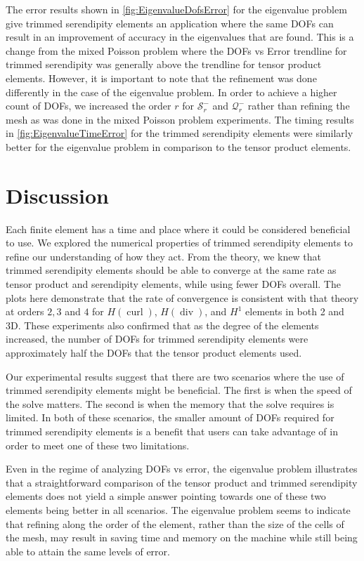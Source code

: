 \documentclass[format=acmsmall,screen,timestamp=false,a4paper]{acmart}
\DeclareMathOperator{\Div}{div}
\DeclareMathOperator{\curl}{curl}
\newcommand{\calQ}{\mathcal{Q}}
\newcommand{\calS}{\mathcal{S}}
\newcommand{\hcurl}{\ensuremath{{H}(\curl)}\xspace}
\newcommand{\hdiv}{\ensuremath{{H}(\Div)}\xspace}
\begin{document}
The error results shown in \cref{fig:EigenvalueDofsError} for the eigenvalue problem give trimmed serendipity elements an application where the same DOFs can result in an improvement of accuracy in the eigenvalues that are found.  This is a change from the mixed Poisson problem where the DOFs vs Error trendline for trimmed serendipity was generally above the trendline for tensor product elements.  However, it is important to note that the refinement was done differently in the case of the eigenvalue problem.  In order to achieve a higher count of DOFs, we increased the order $r$ for $\calS^-_r$ and $\calQ^-_r$ rather than refining the mesh as was done in the mixed Poisson problem experiments.  The timing results in \ref{fig:EigenvalueTimeError} for the trimmed serendipity elements were similarly better for the eigenvalue problem in comparison to the tensor product elements.


\section{Discussion}

Each finite element has a time and place where it could be considered beneficial to use.  We explored the numerical properties of trimmed serendipity elements to refine our understanding of how they act.  From the theory, we knew that trimmed serendipity elements should be able to converge at the same rate as tensor product and serendipity elements, while using fewer DOFs overall.  The plots here demonstrate that the rate of convergence is consistent with that theory at orders $2, 3$ and $4$ for \hcurl, \hdiv, and $H^1$ elements in both 2 and 3D.  These experiments also confirmed that as the degree of the elements increased, the number of DOFs for trimmed serendipity elements were approximately half the DOFs that the tensor product elements used.

Our experimental results suggest that there are two scenarios where the use of trimmed serendipity elements might be beneficial.  The first is when the speed of the solve matters.  The second is when the memory that the solve requires is limited.  In both of these scenarios, the smaller amount of DOFs required for trimmed serendipity elements is a benefit that users can take advantage of in order to meet one of these two limitations.  

Even in the regime of analyzing DOFs vs error, the eigenvalue problem illustrates that a straightforward comparison of the tensor product and trimmed serendipity elements does not yield a simple answer pointing towards one of these two elements being better in all scenarios.  The eigenvalue problem seems to indicate that refining along the order of the element, rather than the size of the cells of the mesh, may result in saving time and memory on the machine while still being able to attain the same levels of error.
\end{document}
